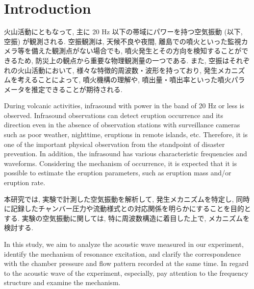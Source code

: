 \documentclass[12pt]{article}
\begin{document}
\newpage
\cleardoublepage


\section{Introduction}\label{ACOintro}

火山活動にともなって, 主に 20 Hz 以下の帯域にパワーを持つ空気振動 (以下, 空振) が観測される. 
空振観測は, 天候不良や夜間, 離島での噴火といった監視カメラ等を備えた観測点がない場合でも, 噴火発生とその方向を検知することができるため, 防災上の観点から重要な物理観測量の一つである.
また, 空振はそれぞれの火山活動において, 様々な特徴的周波数・波形を持っており, 発生メカニズムを考えることによって, 噴火機構の理解や, 噴出量・噴出率といった噴火パラメータを推定できることが期待される.


During volcanic activities, infrasound with power in the band of 20 Hz or less is observed.
Infrasound observations can detect eruption occurrence and its direction even in the absence of observation stations with surveillance cameras such as poor weather, nighttime, eruptions in remote islands, etc. Therefore, it is one of the important physical observation from the standpoint of disaster prevention.
In addition, the infrasound has various characteristic frequencies and waveforms. Considering the mechanism of occurrence, it is expected that it is possible to estimate the eruption parameters, such as eruption mass and/or eruption rate.



本研究では, 実験で計測した空気振動を解析して, 発生メカニズムを特定し, 同時に記録したチャンバー圧力や流動様式との対応関係を明らかにすることを目的とする. 実験の空気振動に関しては, 特に周波数構造に着目した上で, メカニズムを検討する.

In this study, we aim to analyze the acoustic wave measured in our experiment, identify the mechanism of resonance excitation, and clarify the correspondence with the chamber pressure and flow pattern recorded at the same time. In regard to the acoustic wave of the experiment, especially, pay attention to the frequency structure and examine the mechanism.
\end{document}
